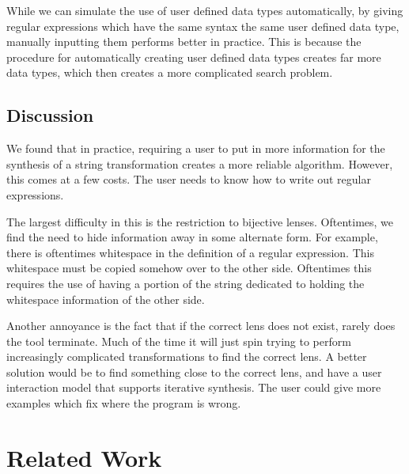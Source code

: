 \documentclass[numbers]{sigplanconf}
\begin{document}
While we can simulate the use of user defined data types automatically, by
giving regular expressions which have the same syntax the same user defined data
type, manually inputting them performs better in practice.  This is because the
procedure for automatically creating user defined data types creates far more
data types, which then creates a more complicated search problem.

\subsection{Discussion}

We found that in practice, requiring a user to put in more information for the
synthesis of a string transformation creates a more reliable algorithm.
However, this comes at a few costs.  The user needs to know how to write out
regular expressions.

The largest difficulty in this is the restriction to bijective lenses.
Oftentimes, we find the need to hide information away in some alternate form.
For example, there is oftentimes whitespace in the definition of a regular
expression.  This whitespace must be copied somehow over to the other side.
Oftentimes this requires the use of having a portion of the string dedicated to
holding the whitespace information of the other side.

Another annoyance is the fact that if the correct lens does not exist,
rarely does the tool terminate.  Much of the time it will just spin trying to
perform increasingly complicated transformations to find the correct lens.
A better solution would be to find something close to the correct lens, and have
a user interaction model that supports iterative synthesis.  The user could give
more examples which fix where the program is wrong.


\section{Related Work}
\end{document}
